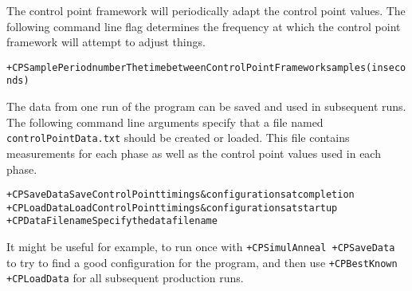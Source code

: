 The control point framework will periodically adapt the control point values. The following command line flag determines the frequency at which the control point framework will attempt to adjust things.
\begin{alltt} 
     +CPSamplePeriod     number The time between Control Point Framework samples (in seconds)
\end{alltt} 

The data from one run of the program can be saved and used in subsequent runs. The following command line arguments specify that a file named \texttt{controlPointData.txt} should be created or loaded. This file contains measurements for each phase as well as the control point values used in each phase. 
\begin{alltt} 
         +CPSaveData            Save Control Point timings \& configurations at completion
         +CPLoadData            Load Control Point timings \& configurations at startup
     +CPDataFilename            Specify the data filename 
\end{alltt} 

It might be useful for example, to run once with \texttt{+CPSimulAnneal +CPSaveData} to try to find a good configuration for the program, and then use  \texttt{+CPBestKnown +CPLoadData} for all subsequent production runs.

